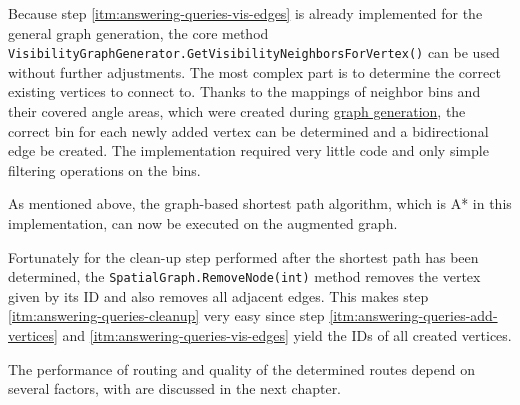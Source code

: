 	Because step \ref{itm:answering-queries-vis-edges} is already implemented for the general graph generation, the core method \texttt{VisibilityGraphGenerator.GetVisibilityNeighborsForVertex()} can be used without further adjustments.
	The most complex part is to determine the correct existing vertices to connect to.
	Thanks to the mappings of neighbor bins and their covered angle areas, which were created during \hyperref[subsec:step-3-graph-creation]{graph generation}, the correct bin for each newly added vertex can be determined and a bidirectional edge be created.
	The implementation required very little code and only simple filtering operations on the bins.
	
	As mentioned above, the graph-based shortest path algorithm, which is A* in this implementation, can now be executed on the augmented graph.
	
	Fortunately for the clean-up step performed after the shortest path has been determined, the \texttt{SpatialGraph.RemoveNode(int)} method removes the vertex given by its ID and also removes all adjacent edges.
	This makes step \ref{itm:answering-queries-cleanup} very easy since step \ref{itm:answering-queries-add-vertices} and \ref{itm:answering-queries-vis-edges} yield the IDs of all created vertices.
	
	The performance of routing and quality of the determined routes depend on several factors, with are discussed in the next chapter.